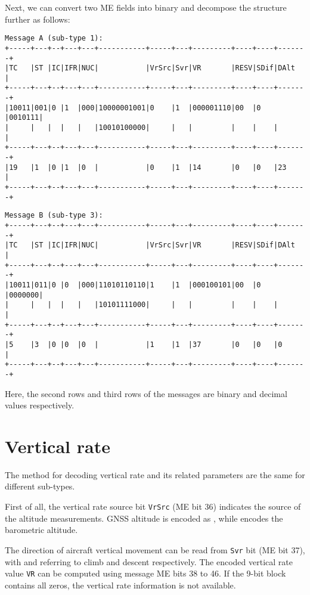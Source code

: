 Next, we can convert two ME fields into binary and decompose the structure further as follows:

\begin{verbatim}
Message A (sub-type 1):
+-----+---+--+---+---+-----------+-----+---+---------+----+----+-------+
|TC   |ST |IC|IFR|NUC|           |VrSrc|Svr|VR       |RESV|SDif|DAlt   |
+-----+---+--+---+---+-----------+-----+---+---------+----+----+-------+
|10011|001|0 |1  |000|10000001001|0    |1  |000001110|00  |0   |0010111|
|     |   |  |   |   |10010100000|     |   |         |    |    |       |
+-----+---+--+---+---+-----------+-----+---+---------+----+----+-------+
|19   |1  |0 |1  |0  |           |0    |1  |14       |0   |0   |23     |
+-----+---+--+---+---+-----------+-----+---+---------+----+----+-------+
\end{verbatim}

\begin{verbatim}
Message B (sub-type 3):
+-----+---+--+---+---+-----------+-----+---+---------+----+----+-------+
|TC   |ST |IC|IFR|NUC|           |VrSrc|Svr|VR       |RESV|SDif|DAlt   |
+-----+---+--+---+---+-----------+-----+---+---------+----+----+-------+
|10011|011|0 |0  |000|11010110110|1    |1  |000100101|00  |0   |0000000|
|     |   |  |   |   |10101111000|     |   |         |    |    |       | 
+-----+---+--+---+---+-----------+-----+---+---------+----+----+-------+
|5    |3  |0 |0  |0  |           |1    |1  |37       |0   |0   |0      |
+-----+---+--+---+---+-----------+-----+---+---------+----+----+-------+
\end{verbatim}

Here, the second rows and third rows of the messages are binary and decimal values respectively.


\section{Vertical rate}

The method for decoding vertical rate and its related parameters are the same for different sub-types.

First of all, the vertical rate source bit \texttt{VrSrc} (ME bit 36) indicates the source of the altitude measurements. GNSS altitude is encoded as \0, while \1 encodes the barometric altitude.

The direction of aircraft vertical movement can be read from \texttt{Svr} bit (ME bit 37), with \0 and \1 referring to climb and descent respectively. The encoded vertical rate value \texttt{VR} can be computed using message ME bits 38 to 46. If the 9-bit block contains all zeros, the vertical rate information is not available.

